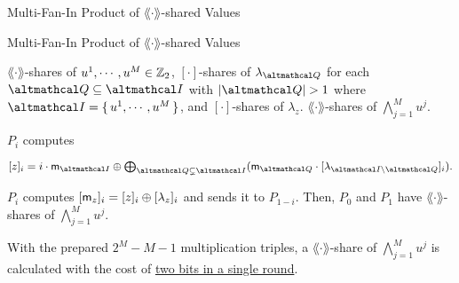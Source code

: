 \documentclass[../240906_cryptlab_flute.tex]{subfiles}
\begin{document}
\begin{frame}{Multi-Fan-In Product of \(\lang\cdot\rang\)-shared Values}
    \begin{block}{Multi-Fan-In Product of \(\lang\cdot\rang\)-shared Values}
        \begin{description}[Output]
            \ii[Input]
            \(\lang\cdot\rang\)-shares of \(u^1, \cdots, u^M \in \mathbb{Z}_2\), \([\cdot]\)-shares of
            \(\lambda_{\mcal{Q}}\) for each \(\mcal{Q} \subseteq \mcal{I}\)
            with \(|\mcal{Q}| > 1\) where \(\mcal{I} = \{\,u^1, \cdots, u^M\,\}\),
            and \([\cdot]\)-shares of \(\lambda_z\).
            \ii[Output]
            \(\lang\cdot\rang\)-shares of \(\bigwedge_{j=1}^M u^j\).
        \end{description}
        \pause
        \begin{enumerate}
            \ii
            \(P_i\) computes
            \centerline{\(
                [z]_i = i \cdot \msf{m}_{\mcal{I}}
                \oplus \bigoplus_{\mcal{Q} \subsetneq \mcal{I}} (\msf{m}_{\mcal{Q}}
                \cdot [\lambda_{\mcal{I} \setminus \mcal{Q}}]_i).
            \)}
            \pause
            \ii
            \(P_i\) computes \([\mathsf{m}_z]_i = [z]_i \oplus [\lambda_z]_i\)
            and sends it to \(P_{1-i}\).
            \ii
            Then, \(P_0\) and \(P_1\) have \(\lang\cdot\rang\)-shares of \(\bigwedge_{j=1}^M u^j\).
        \end{enumerate}
        \pause
        With the prepared \(2^M - M - 1\) multiplication triples,
        a \(\lang\cdot\rang\)-share of \(\bigwedge_{j=1}^M u^j\)
        is calculated with the cost of \ul{two bits in a single round}.
    \end{block}
\end{frame}
\end{document}
